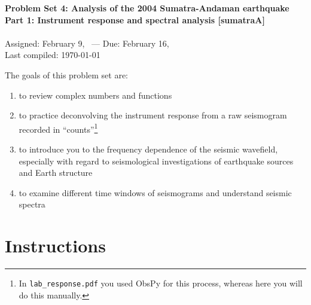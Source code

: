 \documentclass[11pt,titlepage,fleqn]{article}
\begin{document}

\begin{spacing}{1.2}
\centering
{\large \bf Problem Set 4: Analysis of the 2004 Sumatra-Andaman earthquake \\
Part 1: Instrument response and spectral analysis [sumatraA] \\ }
\cltag\ \\
Assigned: February 9, \cyear\ --- Due: February 16, \cyear\ \\
Last compiled: \today
\end{spacing}


\bigskip
\noindent
The goals of this problem set are:
%
\begin{enumerate}
\item to review complex numbers and functions
\item to practice deconvolving the instrument response from a raw seismogram recorded in ``counts''\footnote{In {\tt lab\_response.pdf} you used ObsPy for this process, whereas here you will do this manually.}
\item to introduce you to the frequency dependence of the seismic wavefield, especially with regard to seismological investigations of earthquake sources and Earth structure
\item to examine different time windows of seismograms and understand seismic spectra
\end{enumerate}

\section*{Instructions}
\end{document}
